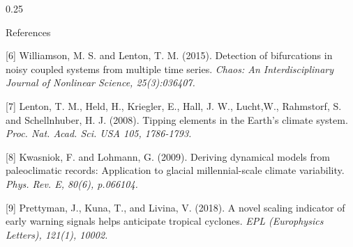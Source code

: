 \documentclass[10pt, final]{beamer}
\begin{document}
\begin{frame}{}
\begin{columns}[T]
\begin{column}{0.25\textwidth}
\begin{block}{References}
{        [6] Williamson, M. S. and Lenton, T. M. (2015). Detection of bifurcations in noisy coupled systems from multiple time series. {\it \footnotesize Chaos: An Interdisciplinary Journal of Nonlinear Science, 25(3):036407.}
        
        [7] Lenton, T. M., Held, H., Kriegler, E., Hall, J. W., Lucht,W., Rahmstorf, S. and Schellnhuber, H. J. (2008). Tipping elements in the Earth's climate system. {\it \footnotesize Proc. Nat. Acad. Sci. USA 105, 1786-1793.}  
        
        [8] Kwasniok, F. and Lohmann, G. (2009). Deriving dynamical models from paleoclimatic records: Application to glacial millennial-scale climate variability. {\it \footnotesize Phys. Rev. E, 80(6), p.066104.}
        
        [9] Prettyman, J., Kuna, T., and Livina, V. (2018). A novel scaling indicator of early warning signals helps anticipate tropical cyclones. {\it \footnotesize EPL (Europhysics Letters), 121(1), 10002.}
            
            
            
        }
    			\end{block}
   		\end{column} 
   	
   	\end{columns}
   	
   	
   	
   	
   	
   	
   	
   	
   	
   	
    	


	 	
\end{frame}
\end{document}
